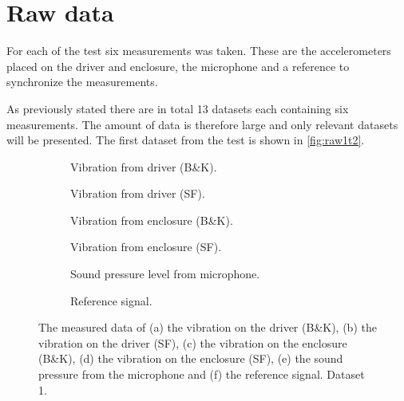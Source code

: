 \section{Raw data}
For each of the test six measurements was taken. These are the accelerometers placed on the
driver and enclosure, the microphone and a reference to synchronize the measurements.

As previously stated there are in total 13 datasets each containing six measurements. The amount of data is therefore large and only
relevant datasets will be presented. The first dataset from the test is shown in \autoref{fig:raw1t2}.

\begin{figure}[H]
\centering
\begin{subfigure}[t]{0.45\textwidth}
    \centering
    
    \caption{Vibration from driver (B\&K).}
    \label{fig:raw1t2_BK_driver1}
\end{subfigure}
\begin{subfigure}[t]{0.45\textwidth}
    \centering
    
    \caption{Vibration from driver (SF).}
    \label{fig:raw1t2_SF_driver1}
\end{subfigure} 

\begin{subfigure}[t]{0.45\textwidth}
    \centering
    
    \caption{Vibration from enclosure (B\&K).}
    \label{fig:raw1t2_BK_enclosure1}
\end{subfigure}
\begin{subfigure}[t]{0.45\textwidth}
    \centering
    
    \caption{Vibration from enclosure (SF).}
    \label{fig:raw1t2_SF_enclosure1}
\end{subfigure}

\begin{subfigure}[t]{0.45\textwidth}
    \centering
    
    \caption{Sound pressure level from microphone.}
    \label{fig:raw1t2_mic1}
\end{subfigure}
\begin{subfigure}[t]{0.45\textwidth}
    \centering
    
    \caption{Reference signal.}
    \label{fig:raw1t2_reference1}
\end{subfigure}

\caption{The measured data of (a) the vibration on the driver (B\&K), (b) the vibration on the driver (SF), (c) the vibration on the enclosure (B\&K), (d) the vibration on the enclosure (SF), (e) the sound pressure from the microphone and (f) the reference signal. Dataset 1.}
\label{fig:raw1t2}
\end{figure} 

